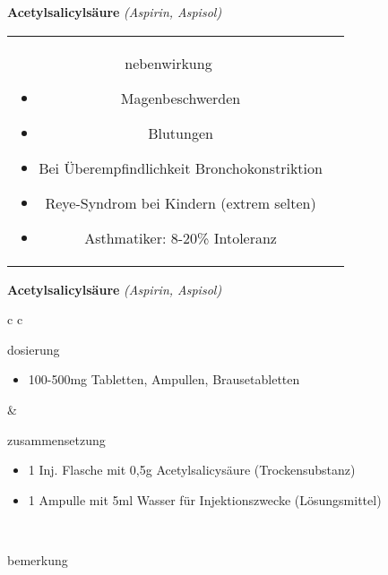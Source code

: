 \begin{frame}{
    \textbf{Acetylsalicylsäure}
    \textit{(Aspirin, Aspisol)}
}
\begin{tabular}{c c}
\begin{beamercolorbox}[wd=\boxwidth\textwidth,ht=\boxheight\textheight,sep=1em]{nebenwirkung}
            \begin{itemize}
                \item Magenbeschwerden
                \item Blutungen
                \item Bei Überempfindlichkeit Bronchokonstriktion
                \item Reye-Syndrom bei Kindern (extrem selten)
                \item Asthmatiker: 8-20\% Intoleranz
            \end{itemize}
        \end{beamercolorbox} \\
    \end{tabular}
\end{frame}

\begin{frame}{
    \textbf{Acetylsalicylsäure}
    \textit{(Aspirin, Aspisol)}
}
    \begin{tabular}{c c}
        \begin{beamercolorbox}[wd=\boxwidth\textwidth,ht=\boxheight\textheight,sep=1em]{dosierung}
            \begin{itemize}
                \item 100-500mg Tabletten, Ampullen, Brausetabletten
            \end{itemize}
        \end{beamercolorbox} & 
        \begin{beamercolorbox}[wd=\boxwidth\textwidth,ht=\boxheight\textheight,sep=1em]{zusammensetzung}
            \begin{itemize}
                \item 1 Inj. Flasche mit 0,5g Acetylsalicysäure (Trockensubstanz)
                \item 1 Ampulle mit 5ml Wasser für Injektionszwecke (Lösungsmittel)
            \end{itemize}
        \end{beamercolorbox} \\
        \begin{beamercolorbox}[wd=\textwidth,ht=\boxheight\textheight,sep=1em]{bemerkung}
        \end{beamercolorbox} \\
    \end{tabular}
\end{frame}

